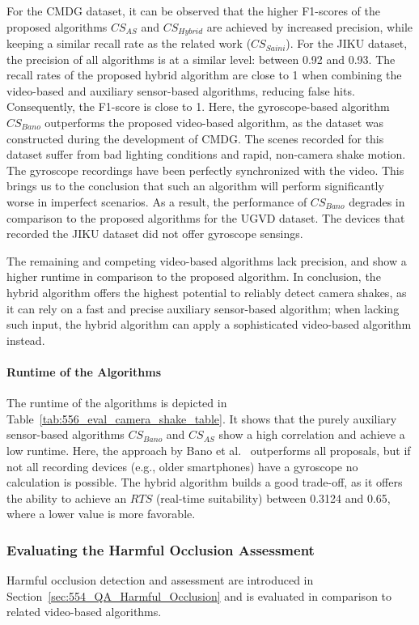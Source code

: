 For the CMDG dataset, it can be observed that the higher F1-scores of the proposed algorithms $CS_{AS}$ and $CS_{Hybrid}$ are achieved by increased precision, while keeping a similar recall rate as the related work ($CS_{Saini}$).
For the JIKU dataset, the precision of all algorithms is at a similar level: between 0.92 and 0.93.
The recall rates of the proposed hybrid algorithm are close to 1 when combining the video-based and auxiliary sensor-based algorithms, reducing false hits. Consequently, the F1-score is close to 1.
Here, the gyroscope-based algorithm $CS_{Bano}$ outperforms the proposed video-based algorithm, as the dataset was constructed during the development of CMDG.
The scenes recorded for this dataset suffer from bad lighting conditions and rapid, non-camera shake motion. 
The gyroscope recordings have been perfectly synchronized with the video.  
This brings us to the conclusion that such an algorithm will perform significantly worse in imperfect scenarios.
As a result, the performance of $CS_{Bano}$ degrades in comparison to the proposed algorithms for the UGVD dataset. 
The devices that recorded the JIKU dataset did not offer gyroscope sensings. 

The remaining and competing video-based algorithms lack precision, and show a higher runtime in comparison to the proposed algorithm.
In conclusion, the hybrid algorithm offers the highest potential to reliably detect camera shakes, as it can rely on a fast and precise auxiliary sensor-based algorithm; when lacking such input, the hybrid algorithm can apply a sophisticated video-based algorithm instead.
\paragraph{Runtime of the Algorithms}
The runtime of the algorithms is depicted in Table~\ref{tab:556_eval_camera_shake_table}.
It shows that the purely auxiliary sensor-based algorithms $CS_{Bano}$ and $CS_{AS}$ show a high correlation and achieve a low runtime. 
Here, the approach by Bano et al.~\cite{Bano2015} outperforms all proposals, but if not all recording devices (e.g., older smartphones) have a gyroscope no calculation is possible.
The hybrid algorithm builds a good trade-off, as it offers the ability to achieve an $RTS$ (real-time suitability) between 0.3124 and 0.65, where a lower value is more favorable.
\subsubsection{Evaluating the Harmful Occlusion Assessment}
Harmful occlusion detection and assessment are introduced in Section~\ref{sec:554_QA_Harmful_Occlusion} and is evaluated in comparison to related video-based algorithms.
